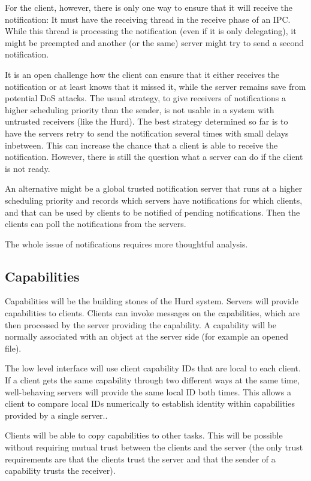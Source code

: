 \documentclass[9pt,a4paper]{extarticle}
\begin{document}
For the client, however, there is only one way to ensure that it will
receive the notification: It must have the receiving thread in the
receive phase of an IPC.  While this thread is processing the
notification (even if it is only delegating), it might be preempted
and another (or the same) server might try to send a second
notification.
  
It is an open challenge how the client can ensure that it either
receives the notification or at least knows that it missed it, while
the server remains save from potential DoS attacks.  The usual
strategy, to give receivers of notifications a higher scheduling
priority than the sender, is not usable in a system with untrusted
receivers (like the Hurd).  The best strategy determined so far is to
have the servers retry to send the notification several times with
small delays inbetween.  This can increase the chance that a client is
able to receive the notification.  However, there is still the
question what a server can do if the client is not ready.
  
An alternative might be a global trusted notification server that runs
at a higher scheduling priority and records which servers have
notifications for which clients, and that can be used by clients to be
notified of pending notifications.  Then the clients can poll the
notifications from the servers.

The whole issue of notifications requires more thoughtful analysis.

\subsection{Capabilities}
  
Capabilities will be the building stones of the Hurd system.  Servers
will provide capabilities to clients.  Clients can invoke messages on
the capabilities, which are then processed by the server providing the
capability.  A capability will be normally associated with an object
at the server side (for example an opened file).

The low level interface will use client capability IDs that are local
to each client.  If a client gets the same capability through two
different ways at the same time, well-behaving servers will provide
the same local ID both times.  This allows a client to compare local
IDs numerically to establish identity within capabilities provided by
a single server..

Clients will be able to copy capabilities to other tasks.  This will
be possible without requiring mutual trust between the clients and the
server (the only trust requirements are that the clients trust the
server and that the sender of a capability trusts the receiver).
  
\end{document}
